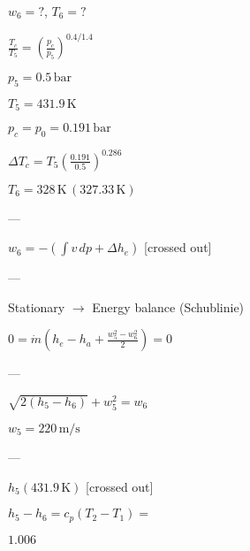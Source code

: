 \( w_6 = ? \), \( T_6 = ? \)

\( \frac{T_c}{T_5} = \left( \frac{p_c}{p_5} \right)^{0.4 / 1.4} \)

\( p_5 = 0.5 \, \text{bar} \)

\( T_5 = 431.9 \, \text{K} \)

\( p_c = p_0 = 0.191 \, \text{bar} \)

\( \Delta T_c = T_5 \left( \frac{0.191}{0.5} \right)^{0.286} \)

\( T_6 = 328 \, \text{K} \, (327.33 \, \text{K}) \)

---

\( w_6 = - \left( \int v \, dp + \Delta h_e \right) \) [crossed out]

---

Stationary \( \rightarrow \) Energy balance (Schublinie)

\( 0 = \dot{m} \left( h_e - h_a + \frac{w_5^2 - w_6^2}{2} \right) = 0 \)

---

\( \sqrt{2 (h_5 - h_6)} + w_5^2 = w_6 \)

\( w_5 = 220 \, \text{m/s} \)

---

\( h_5 (431.9 \, \text{K}) \) [crossed out]

\( h_5 - h_6 = c_p (T_2 - T_1) = \)

\( 1.006 \)